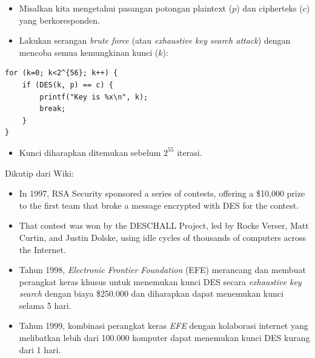 \documentclass{article}
\begin{document}
\newpage


\begin{itemize}
    \item Misalkan kita mengetahui pasangan potongan plaintext ($p$) dan cipherteks ($c$) yang berkoresponden.
    \item Lakukan serangan \textit{brute force} (atau \textit{exhaustive key search attack}) dengan mencoba semua kemungkinan kunci ($k$):
\end{itemize}

\vspace{5mm}

\begin{verbatim}
for (k=0; k<2^{56}; k++) {
    if (DES(k, p) == c) {
        printf("Key is %x\n", k);
        break;
    }
}
\end{verbatim}

\vspace{5mm}

\begin{itemize}
    \item Kunci diharapkan ditemukan sebelum $2^{55}$ iterasi.
\end{itemize}

\newpage


Dikutip dari Wiki:\
\begin{itemize}
    \item In 1997, RSA Security sponsored a series of contests, offering a \$10,000 prize to the first team that broke a message encrypted with DES for the contest.
    \item That contest was won by the DESCHALL Project, led by Rocke Verser, Matt Curtin, and Justin Dolske, using idle cycles of thousands of computers across the Internet.
\end{itemize}

\newpage


\begin{itemize}
    \item Tahun 1998, \textit{Electronic Frontier Foundation} (EFE) merancang dan membuat perangkat keras khusus untuk menemukan kunci DES secara \textit{exhaustive key search} dengan biaya \$250.000 dan diharapkan dapat menemukan kunci selama 5 hari.
    \item Tahun 1999, kombinasi perangkat keras \textit{EFE} dengan kolaborasi internet yang melibatkan lebih dari 100.000 komputer dapat menemukan kunci DES kurang dari 1 hari.
\end{itemize}
\end{document}
